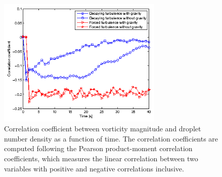 \begin{figure}[H]\centering
\includegraphics[width=0.7\textwidth]{Figures/correlation} \caption{Correlation
coefficient between vorticity magnitude and droplet number density as a
function of time. The correlation coefficients are computed following the
Pearson product-moment correlation coefficients, which measures the linear
correlation between two variables with positive and negative correlations
inclusive.\label{fig:correlation}} \end{figure}
